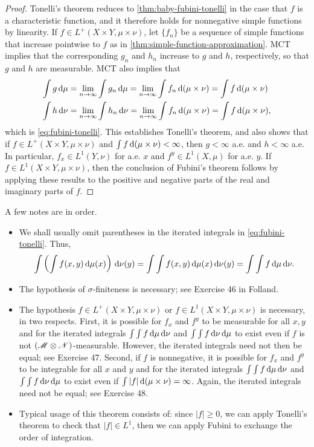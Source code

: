 \documentclass[12pt]{article} %
\begin{document}
\begin{proof}
    Tonelli's theorem reduces to \cref{thm:baby-fubini-tonelli} in the case that $f$ is a characteristic function, and it therefore holds for nonnegative simple functions by linearity. If $f \in L^+(X \times Y, \mu \times \nu)$, let $\{f_n\}$ be a sequence of simple functions that increase pointwise to $f$ as in \cref{thm:simple-function-approximation}. MCT implies that the corresponding $g_n$ and $h_n$ increase to $g$ and $h$, respectively, so that $g$ and $h$ are measurable. MCT also implies that \begin{align*}
        \int g \, \mathrm{d} \mu &= \lim_{n \to \infty} \int g_n \, \mathrm{d} \mu = \lim_{n \to \infty} \int f_n \, \mathrm{d} (\mu \times \nu) = \int f \, \mathrm{d} (\mu \times \nu)\\
        \int h \, \mathrm{d} \nu &= \lim_{n \to \infty} \int h_n \, \mathrm{d} \nu = \lim_{n \to \infty} \int f_n \, \mathrm{d} (\mu \times \nu) = \int f \, \mathrm{d} (\mu \times \nu),
    \end{align*} which is \cref{eq:fubini-tonelli}. This establishes Tonelli's theorem, and also shows that if $f \in L^+(X \times Y, \mu \times \nu)$ and $\int f \, \mathrm{d} (\mu \times \nu) < \infty$, then $g < \infty$ a.e. and $h < \infty$ a.e. In particular, $f_x \in L^1(Y, \nu)$ for a.e. $x$ and $f^y \in L^1(X, \mu)$ for a.e. $y$. If $f \in L^1(X \times Y, \mu \times \nu)$, then the conclusion of Fubini's theorem follows by applying these results to the positive and negative parts of the real and imaginary parts of $f$.
\end{proof}

\begin{remark}
    A few notes are in order.\begin{itemize}
        \item We shall usually omit parentheses in the iterated integrals in \cref{eq:fubini-tonelli}. Thus, \[\int \left( \int f(x, y) \, \mathrm{d} \mu(x) \right) \, \mathrm{d} \nu(y) = \int \int f(x, y) \, \mathrm{d} \mu(x) \, \mathrm{d} \nu(y) = \int \int f \, \mathrm{d}\mu \, \mathrm{d} \nu.\]
        \item The hypothesis of $\sigma$-finiteness is necessary; see Exercise 46 in Folland.
        \item The hypothesis $f \in L^+(X \times Y, \mu \times \nu)$ or $f \in L^1(X \times Y, \mu \times \nu)$ is necessary, in two respects. First, it is possible for $f_x$ and $f^y$ to be measurable for all $x, y$ and for the iterated integrals $\int \int f \, \mathrm{d} \mu\, \mathrm{d} \nu$ and $\int \int f \, \mathrm{d}\nu\, \mathrm{d}\mu$ to exist even if $f$ is not $(\mathscr{M} \otimes \mathscr{N})$-measurable. However, the iterated integrals need not then be equal; see Exercise 47. Second, if $f$ is nonnegative, it is possible for $f_x$ and $f^y$ to be integrable for all $x$ and $y$ and for the iterated integrals $\int \int f \, \mathrm{d}\mu\, \mathrm{d}\nu$ and $\int \int f \, \mathrm{d}\nu\, \mathrm{d}\mu$ to exist even if $\int |f| \, \mathrm{d}(\mu \times \nu) = \infty$. Again, the iterated integrals need not be equal; see Exercise 48.
        \item  Typical usage of this theorem consists of: since $|f| \geq 0$, we can apply Tonelli's theorem to check that $|f| \in L^1$, then we can apply Fubini to exchange the order of integration.
    \end{itemize}
\end{remark}
\end{document}
